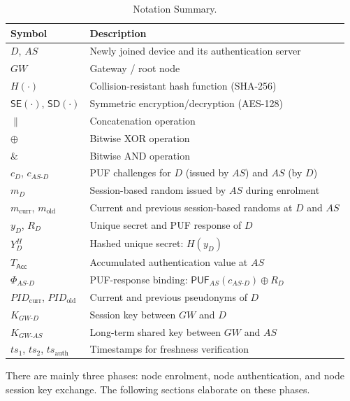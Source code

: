 \begin{table}[!ht]
  \centering
  \caption{Notation Summary.}
  \label{tab:notations}
  \small
  \setlength{\tabcolsep}{8pt}
  \begin{tabular}{ll}
    \toprule
    Symbol & Description \\
    \midrule
    $D$, $AS$ & Newly joined device and its authentication server \\
    $GW$ & Gateway / root node \\
    $H(\cdot)$ & Collision-resistant hash function (SHA-256) \\
    $\mathsf{SE}(\cdot)$, $\mathsf{SD}(\cdot)$ & Symmetric encryption/decryption (AES-128) \\
    $\|$ & Concatenation operation \\
    $\oplus$ & Bitwise XOR operation \\
    $\mathbin{\&}$ & Bitwise AND operation \\
    $c_D$, $c_{AS\text{-}D}$ & PUF challenges for $D$ (issued by $AS$) and $AS$ (by $D$) \\
    $m_D$ & Session-based random issued by $AS$ during enrolment \\
    $m_{\mathrm{curr}}$, $m_{\mathrm{old}}$ & Current and previous session-based randoms at $D$ and $AS$ \\
    $y_D$, $R_D$ & Unique secret and PUF response of $D$ \\
    $Y_D^H$ & Hashed unique secret: $H(y_D)$ \\
    $T_\mathsf{Acc}$ & Accumulated authentication value at $AS$ \\
    $\Phi_{AS\text{-}D}$ & PUF-response binding: $\mathsf{PUF}_{AS}(c_{AS\text{-}D}) \oplus R_D$ \\
    $\mathit{PID}_{\mathrm{curr}}$, $\mathit{PID}_{\mathrm{old}}$ & Current and previous pseudonyms of $D$ \\
    $K_{GW\text{-}D}$ & Session key between $GW$ and $D$ \\
    $K_{GW\text{-}AS}$ & Long-term shared key between $GW$ and $AS$ \\
    $ts_1$, $ts_2$, $ts_{\mathrm{auth}}$ & Timestamps for freshness verification \\
    \bottomrule
  \end{tabular}
\end{table}

There are mainly three phases: node enrolment, node authentication, and node session
key exchange.
The following sections elaborate on these phases.

